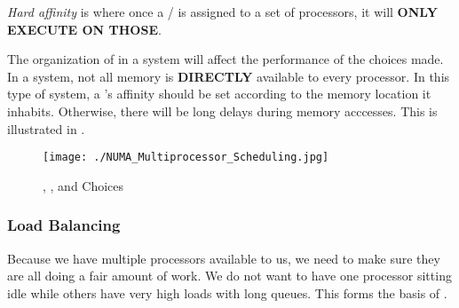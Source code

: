 \begin{definition}\label{def:Hard_Affinity}
  \emph{Hard affinity} is where once a / is assigned to a set of processors, it will \textbf{ONLY EXECUTE ON THOSE}.
\end{definition}

The organization of  in a system will affect the performance of the  choices made.
In a  system, not all memory is \textbf{DIRECTLY} available to every processor.
In this type of system, a 's affinity should be set according to the memory location it inhabits.
Otherwise, there will be long delays during memory acccesses.
This is illustrated in .

\begin{figure}[h!tbp]
  \centering
  \texttt{[image: ./NUMA\_Multiprocessor\_Scheduling.jpg]}
  \caption{, , and  Choices}
  \label{fig:NUMA_Multiprocessor_Scheduling}
\end{figure}

\subsubsection{Load Balancing}\label{subsubsec:Load_Balancing}
Because we have multiple processors available to us, we need to make sure they are all doing a fair amount of work.
We do not want to have one processor sitting idle while others have very high loads with long queues.
This forms the basis of .

